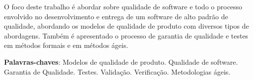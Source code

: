 \documentclass[
	12pt,				%
	openright,			%
	oneside,			%
	a4paper,			%
	english,			%
	brazil,				%
	]{abntex2}
\begin{document}
\frenchspacing 


\imprimircapa

\imprimirfolhaderosto


\begin{resumo}
O foco deste trabalho é abordar sobre qualidade de software e todo o processo envolvido no desenvolvimento e entrega de um software de alto padrão de qualidade, abordando os modelos de qualidade de produto com diversos tipos de abordagens. Também é apresentado o processo de garantia de qualidade e testes em métodos formais e em métodos ágeis.

 \vspace{\onelineskip}
    
 \noindent
 \textbf{Palavras-chaves}: Modelos de qualidade de produto. Qualidade de software. Garantia de Qualidade. Testes. Validação. Verificação. Metodologias ágeis.
\end{resumo}

\listoffigures*
\cleardoublepage

\listoftables*
\cleardoublepage
\end{document}
